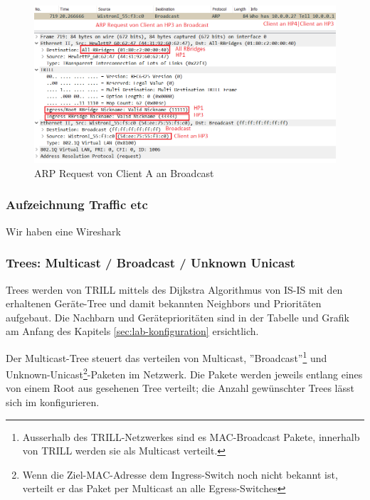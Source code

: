 \clearpage



\begin{figure}
\centering
\includegraphics[width=\linewidth]{images/trill_package}
\caption{ARP Request von Client A an Broadcast}
\label{fig:trillpackage}
\end{figure}



\subsubsection{Aufzeichnung Traffic etc}

Wir haben eine Wireshark


\subsubsection{Trees: Multicast / Broadcast / Unknown Unicast}\label{sec:trees-multicast--broadcast--unknown-unicast}

Trees werden von TRILL mittels des Dijkstra Algorithmus von IS-IS mit den erhaltenen Geräte-Tree und damit bekannten Neighbors und Prioritäten aufgebaut. Die Nachbarn und Geräteprioritäten sind in der Tabelle und Grafik am Anfang des Kapitels \ref{sec:lab-konfiguration} ersichtlich.

Der Multicast-Tree steuert das verteilen von Multicast, ''Broadcast''\footnote{Ausserhalb des TRILL-Netzwerkes sind es MAC-Broadcast Pakete, innerhalb von TRILL werden sie als Multicast verteilt.} und Unknown-Unicast\footnote{Wenn die Ziel-MAC-Adresse dem Ingress-Switch noch nicht bekannt ist, verteilt er das Paket per Multicast an alle Egress-Switches}-Paketen im Netzwerk. Die Pakete werden jeweils entlang eines von einem Root aus gesehenen Tree verteilt; die Anzahl gewünschter Trees lässt sich im konfigurieren.

